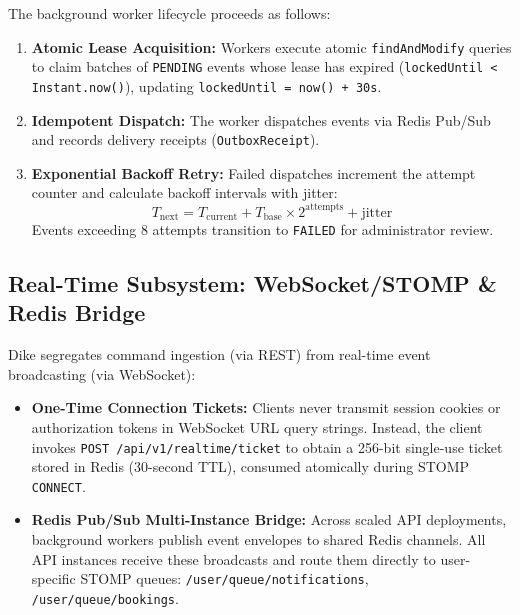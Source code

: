 \documentclass[conference,10pt,a4paper]{IEEEtran}
\begin{document}
The background worker lifecycle proceeds as follows:
\begin{enumerate}
    \item \textbf{Atomic Lease Acquisition:} Workers execute atomic \texttt{findAndModify} queries to claim batches of \texttt{PENDING} events whose lease has expired (\texttt{lockedUntil < Instant.now()}), updating \texttt{lockedUntil = now() + 30s}.
    \item \textbf{Idempotent Dispatch:} The worker dispatches events via Redis Pub/Sub and records delivery receipts (\texttt{OutboxReceipt}).
    \item \textbf{Exponential Backoff Retry:} Failed dispatches increment the attempt counter and calculate backoff intervals with jitter:
    \begin{equation}
    T_{\text{next}} = T_{\text{current}} + T_{\text{base}} \times 2^{\text{attempts}} + \text{jitter}
    \end{equation}
    Events exceeding 8 attempts transition to \texttt{FAILED} for administrator review.
\end{enumerate}

\subsection{Real-Time Subsystem: WebSocket/STOMP \& Redis Bridge}
Dike segregates command ingestion (via REST) from real-time event broadcasting (via WebSocket):
\begin{itemize}
    \item \textbf{One-Time Connection Tickets:} Clients never transmit session cookies or authorization tokens in WebSocket URL query strings. Instead, the client invokes \texttt{POST /api/v1/realtime/ticket} to obtain a 256-bit single-use ticket stored in Redis (30-second TTL), consumed atomically during STOMP \texttt{CONNECT}.
    \item \textbf{Redis Pub/Sub Multi-Instance Bridge:} Across scaled API deployments, background workers publish event envelopes to shared Redis channels. All API instances receive these broadcasts and route them directly to user-specific STOMP queues: \texttt{/user/queue/notifications}, \texttt{/user/queue/bookings}.
\end{itemize}
\end{document}
